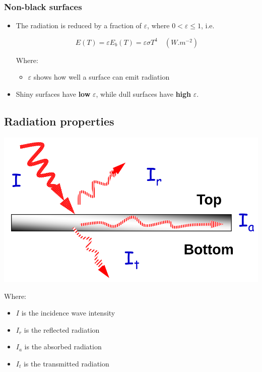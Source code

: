 \documentclass[11pt]{article}
\begin{document}
\subsubsection{Non-black surfaces}
\label{sec:org75ed807}
\begin{itemize}
\item The radiation is reduced by a fraction of \(\varepsilon\), where \(0 < \varepsilon \le 1\), i.e.

\[E(T) = \varepsilon E_b (T) = \varepsilon \sigma T^4 \quad (\unit{W.m^{-2}})\]

Where:
\begin{itemize}
\item \(\varepsilon\) shows how well a surface can emit radiation
\end{itemize}
\item Shiny surfaces have \textbf{low} \(\varepsilon\), while dull surfaces have \textbf{high} \(\varepsilon\).
\end{itemize}

\subsection{Radiation properties}
\label{sec:org5b72e38}
\begin{center}
\includegraphics[width=.9\linewidth]{./images/radiation-properties.png}
\end{center}

Where:
\begin{itemize}
\item \(I\) is the incidence wave intensity
\item \(I_r\) is the reflected radiation
\item \(I_a\) is the absorbed radiation
\item \(I_t\) is the transmitted radiation
\end{itemize}
\end{document}
